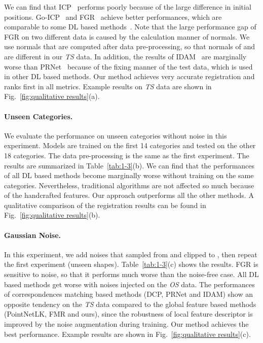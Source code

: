 \documentclass[10pt,twocolumn,letterpaper]{article}
\begin{document}
We can find that ICP~\cite{besl1992method} performs poorly because of the large difference in initial positions. Go-ICP~\cite{yang2013go} and FGR~\cite{zhou2016fast} achieve better performances, which are comparable to some DL based methods~\cite{aoki2019pointnetlk, wang2019deep, huang2020feature, idam}. Note that the large performance gap of FGR on two different data is caused by the calculation manner of normals. We use normals that are computed after data pre-processing, so that normals of  and  are different in our \emph{TS} data. In addition, the results of IDAM~\cite{idam} are marginally worse than PRNet~\cite{wang2019prnet} because of the fixing manner of the test data, which is used in other DL based methods. Our method achieves very accurate registration and ranks first in all metrics. Example results on \emph{TS} data are shown in Fig.~\ref{fig:qualitative results}(a).

\vspace{-0.47cm}
\paragraph{Unseen Categories.}
We evaluate the performance on unseen categories without noise in this experiment. Models are trained on the first 14 categories and tested on the other 18 categories. The data pre-processing is the same as the first experiment. The results are summarized in Table~\ref{tab:1-3}(b). We can find that the performances of all DL based methods become marginally worse without training on the same categories. Nevertheless, traditional algorithms are not affected so much because of the handcrafted features. Our approach outperforms all the other methods. A qualitative comparison of the registration results can be found in Fig.~\ref{fig:qualitative results}(b).

\vspace{-0.47cm}
\paragraph{Gaussian Noise.}
In this experiment, we add noises that sampled from  and clipped to , then repeat the first experiment (unseen shapes). Table~\ref{tab:1-3}(c) shows the results. FGR is sensitive to noise, so that it performs much worse than the noise-free case. All DL based methods get worse with noises injected on the \emph{OS} data. The performances of correspondences matching based methods (DCP, PRNet and IDAM) show an opposite tendency on the \emph{TS} data compared to the global feature based methods (PointNetLK, FMR and ours), since the robustness of local feature descriptor is improved by the noise augmentation during training. Our method achieves the best performance. Example results are shown in Fig.~\ref{fig:qualitative results}(c).
\end{document}
